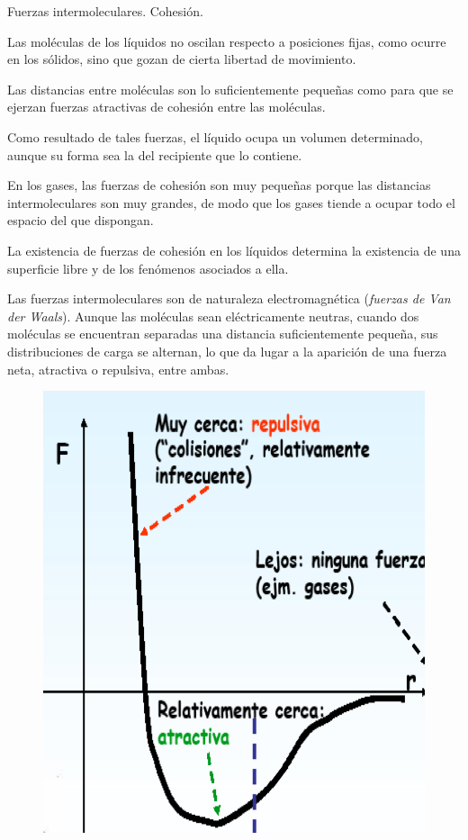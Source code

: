 \begin{myblock}{Fuerzas intermoleculares. Cohesión.}

\vspace{2mm} Las moléculas de los líquidos no oscilan respecto a posiciones fijas, como ocurre en los sólidos, sino que gozan de cierta libertad de movimiento. 

\vspace{2mm} Las distancias entre moléculas son lo suficientemente pequeñas como para que se ejerzan fuerzas atractivas de cohesión entre las moléculas. 

\vspace{2mm} Como resultado de tales fuerzas, el líquido ocupa un volumen determinado, aunque su forma sea la del recipiente que lo contiene. 

\vspace{2mm} En los gases, las fuerzas de cohesión son muy pequeñas porque las distancias intermoleculares son muy grandes, de modo que los gases tiende a ocupar todo el espacio del que dispongan. 

\vspace{2mm} La existencia de fuerzas de cohesión en los líquidos determina la existencia de una superficie libre y de los fenómenos asociados a ella. 


\vspace{2mm} 
\begin{multicols}{2}
Las fuerzas intermoleculares son de naturaleza electromagnética (\emph{fuerzas de Van der Waals}). Aunque las moléculas sean eléctricamente neutras, cuando dos moléculas se encuentran separadas una distancia suficientemente pequeña, sus distribuciones de carga se alternan, lo que da lugar a la aparición de una fuerza neta, atractiva o repulsiva, entre ambas. 

\begin{figure}[H]
	\centering
	\includegraphics[width=.45\textwidth]{imagenes/imagenes08/T08IM21.png}
\end{figure}
\end{multicols}


\end{myblock}
